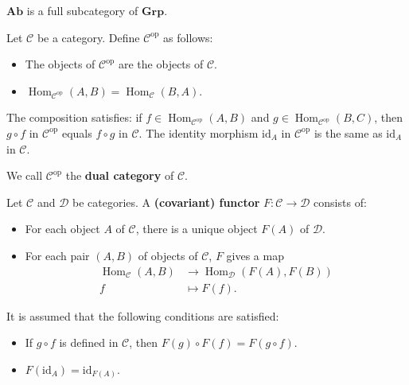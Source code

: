\documentclass[11pt, a4paper]{report}
\begin{document}
\begin{example}
$\mathbf{Ab}$ is a full subcategory of $\mathbf{Grp}$.
\end{example}

\begin{definition}
Let $\mathcal{C}$ be a category. Define $\mathcal{C}^{\mathrm{op}}$ as follows:
\begin{itemize}
    \item The objects of $\mathcal{C}^{\mathrm{op}}$ are the objects of $\mathcal{C}$.
    \item $\operatorname{Hom}_{\mathcal{C}^{\mathrm{op}}}(A, B) = \operatorname{Hom}_{\mathcal{C}}(B, A)$.
\end{itemize}
The composition satisfies: if $f \in \operatorname{Hom}_{\mathcal{C}^{\mathrm{op}}}(A, B)$ and $g \in \operatorname{Hom}_{\mathcal{C}^{\mathrm{op}}}(B, C)$, then $g \circ f$ in $\mathcal{C}^{\mathrm{op}}$ equals $f \circ g$ in $\mathcal{C}$. The identity morphism $\mathrm{id}_A$ in $\mathcal{C}^{\mathrm{op}}$ is the same as $\mathrm{id}_A$ in $\mathcal{C}$.

We call $\mathcal{C}^{\mathrm{op}}$ the \textbf{dual category} of $\mathcal{C}$.
\end{definition}

\begin{definition}
Let $\mathcal{C}$ and $\mathcal{D}$ be categories. A \textbf{(covariant) functor} $F \colon \mathcal{C} \to \mathcal{D}$ consists of:
\begin{itemize}
    \item For each object $A$ of $\mathcal{C}$, there is a unique object $F(A)$ of $\mathcal{D}$.
    \item For each pair $(A, B)$ of objects of $\mathcal{C}$, $F$ gives a map
    \[
    \begin{aligned}
    \operatorname{Hom}_{\mathcal{C}}(A, B) &\to \operatorname{Hom}_{\mathcal{D}}(F(A), F(B)) \\
    f &\mapsto F(f).
    \end{aligned}
    \]
\end{itemize}
It is assumed that the following conditions are satisfied:
\begin{itemize}
    \item If $g \circ f$ is defined in $\mathcal{C}$, then $F(g) \circ F(f) = F(g \circ f)$.
    \item $F(\mathrm{id}_A) = \mathrm{id}_{F(A)}$.
\end{itemize}
\end{definition}
\end{document}
